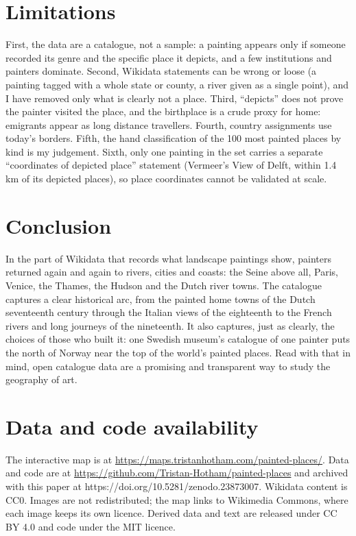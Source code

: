 \documentclass[11pt,a4paper]{article}
\begin{document}
\section{Limitations}
First, the data are a catalogue, not a sample: a painting appears only if someone recorded its genre and the specific place it depicts, and a few institutions and painters dominate. Second, Wikidata statements can be wrong or loose (a painting tagged with a whole state or county, a river given as a single point), and I have removed only what is clearly not a place. Third, ``depicts'' does not prove the painter visited the place, and the birthplace is a crude proxy for home: emigrants appear as long distance travellers. Fourth, country assignments use today's borders. Fifth, the hand classification of the 100 most painted places by kind is my judgement. Sixth, only one painting in the set carries a separate ``coordinates of depicted place'' statement (Vermeer's View of Delft, within 1.4 km of its depicted places), so place coordinates cannot be validated at scale.

\section{Conclusion}
In the part of Wikidata that records what landscape paintings show, painters returned again and again to rivers, cities and coasts: the Seine above all, Paris, Venice, the Thames, the Hudson and the Dutch river towns. The catalogue captures a clear historical arc, from the painted home towns of the Dutch seventeenth century through the Italian views of the eighteenth to the French rivers and long journeys of the nineteenth. It also captures, just as clearly, the choices of those who built it: one Swedish museum's catalogue of one painter puts the north of Norway near the top of the world's painted places. Read with that in mind, open catalogue data are a promising and transparent way to study the geography of art.

\section*{Data and code availability}
The interactive map is at \url{https://maps.tristanhotham.com/painted-places/}. Data and code are at \url{https://github.com/Tristan-Hotham/painted-places} and archived with this paper at https://doi.org/10.5281/zenodo.23873007. Wikidata content is CC0. Images are not redistributed; the map links to Wikimedia Commons, where each image keeps its own licence. Derived data and text are released under CC BY 4.0 and code under the MIT licence.
\end{document}
